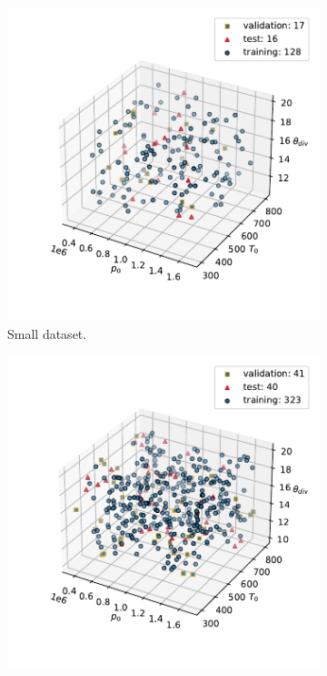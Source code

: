 \begin{figure}[t]
    \centering
    \begin{subfigure}{0.3\textwidth}
        \centering
        \includegraphics[width=\linewidth]{Figuras/lhs/data_adiabatic/doe_200/lhs_all.pdf}  
        \caption{Small dataset.}
        \label{fig:lhs_adiabatic_200}
    \end{subfigure}
    \begin{subfigure}{0.3\textwidth}
        \centering
        \includegraphics[width=\linewidth]{Figuras/lhs/data_adiabatic/doe_500/lhs_all.pdf}  

\end{subfigure}
\end{figure}
